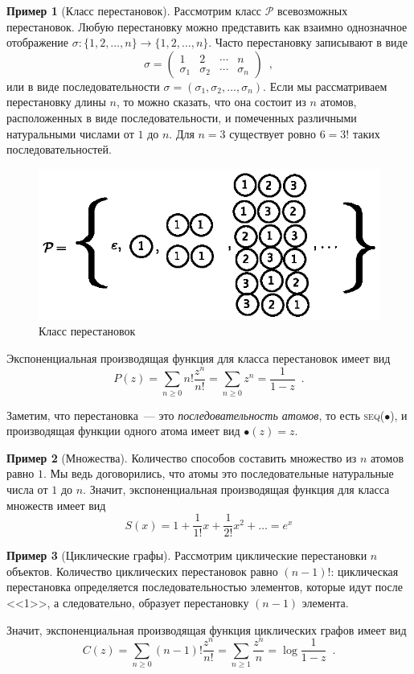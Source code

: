 \documentclass[a5paper]{article}
\theoremstyle{definition}
\newtheorem{example}{Пример}
\begin{document}
\begin{example}[Класс перестановок]
Рассмотрим класс \( \mathcal P \) всевозможных перестановок. Любую перестановку 
можно представить как взаимно однозначное отображение \( \sigma \colon \{ 1, 2, 
\ldots, n \} \to \{ 1, 2, \ldots, n \} \). Часто перестановку записывают в виде
\[
	\sigma = \begin{pmatrix}
		1 & 2 & \cdots & n \\
		\sigma_1 & \sigma_2 & \cdots & \sigma_n
	\end{pmatrix} \enspace ,
\]
или в виде последовательности \( \sigma = (\sigma_1, \sigma_2, \ldots, 
\sigma_n) \). Если мы рассматриваем перестановку длины \( n \), то можно 
сказать, что она состоит из \( n \) атомов, расположенных в виде 
последовательности, и помеченных различными натуральными 
числами от \( 1 \) до \( n \). Для \( n = 3 \) существует ровно \( 6 = 3! \) 
таких последовательностей.

\begin{figure}[h]
\centering
	\includegraphics[width=.5\textwidth]{permutation.eps}
	\caption{Класс перестановок}
	\label{fig:permutation}	
\end{figure}

Экспоненциальная производящая функция для класса перестановок имеет вид
\[
	P(z) = \sum_{n \geq 0} n! \dfrac{z^n}{n!} = \sum_{n \geq 0}z^n = 
	\dfrac{1}{1 - z} \enspace .
\]

Заметим, что перестановка~--- это \textit{последовательность атомов}, то есть 
\textsc{seq}(\( \bullet \)), и производящая функции одного атома имеет вид \( 
\bullet(z) = z \).
\end{example}

\begin{example}[Множества]
	Количество способов составить множество из \( n \) атомов равно \( 1 \). Мы 
	ведь договорились, что атомы это последовательные натуральные числа от \( 1 
	\) до \( n \). Значит, экспоненциальная производящая функция для класса 
	множеств имеет вид
	\[
		S(x) = 1 + \dfrac{1}{1!}x + \dfrac{1}{2!}x^2 + \ldots = e^x
	\]
\end{example}

\begin{example}[Циклические графы]
	Рассмотрим циклические перестановки \( n \) объектов. Количество 
	циклических перестановок равно \( (n-1)! \): циклическая перестановка 
	определяется последовательностью элементов, которые идут после <<1>>, а 
	следовательно, образует перестановку \( (n-1) \) элемента.
	
	Значит, экспоненциальная производящая функция циклических графов имеет вид
	\[
		C(z) = \sum_{n \geq 0} (n-1)! \dfrac{z^n}{n!} = \sum_{n \geq 1} 
		\dfrac{z^n}{n} = \log \dfrac{1}{1 - z} \enspace .
	\]
\end{example}
\end{document}
